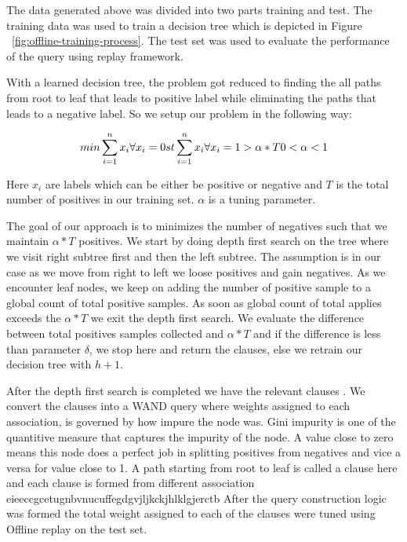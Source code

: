 The data generated above was divided into two parts training and test. The training data was used to train a decision tree which is depicted in Figure ~\ref{fig:offline-training-process}. The test set was used to evaluate the performance of the query using replay framework. 

With a learned decision tree, the problem got reduced to finding the all paths from root to leaf that leads to positive label while eliminating the paths that leads to a negative label. So we setup our problem in the following way:

\begin{equation}
min \sum_{i=1}^{n}{x_i}  \forall x_i = 0 \\
st \sum_{i=1}^{n}{x_i}  \forall x_i = 1 > \alpha * T
0 < \alpha < 1
\end{equation}

Here $x_i$ are labels which can be either be positive or negative and $T$ is the total number of positives in our training set. $\alpha$ is a tuning parameter.

The goal of our approach is to  minimizes the number of negatives such that we maintain $\alpha * T$ positives.  We start by doing depth first search on the tree where we visit right subtree first and then the left subtree. The assumption is in our case as we move from right to left we loose positives and gain negatives. As we encounter leaf nodes, we keep on adding the number of positive sample to a global count of total positive samples.  As soon as global count of total applies exceeds the $\alpha * T$ we exit the depth first search.  We evaluate the difference between total positives samples collected and  $\alpha * T$ and if the difference is less than parameter $\delta$, we stop here and return the clauses, else we retrain our decision tree with  $h + 1$. 

After the depth first search is completed we have the relevant clauses . We convert the clauses into a  WAND query where weights assigned to each association, is governed by how impure the node was. Gini impurity is one of the quantitive measure that captures the impurity of the node. A value close to zero means this node does a perfect job in splitting positives from negatives and vice a versa for value close to 1. A path starting from root to leaf is called a clause here and each clause is formed from different association eieeccgcetugnbvnucuffegdgvjljkckjhlklgjerctb
  After the query construction logic was formed the total weight assigned to each of the clauses were tuned using Offline replay on the test set. 

